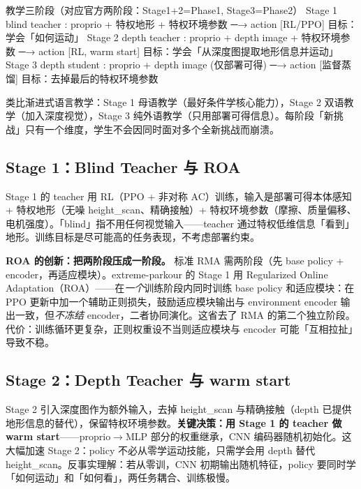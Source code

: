 \begin{codebox}[text]{教学三阶段（对应官方两阶段：Stage1+2=Phase1, Stage3=Phase2）}
Stage 1  blind teacher : proprio + 特权地形 + 特权环境参数 ─→ action   [RL/PPO]
                         目标：学会「如何运动」
Stage 2  depth teacher : proprio + depth image + 特权环境参数 ─→ action [RL, warm start]
                         目标：学会「从深度图提取地形信息并运动」
Stage 3  depth student : proprio + depth image (仅部署可得) ─→ action   [监督蒸馏]
                         目标：去掉最后的特权环境参数
\end{codebox}

类比渐进式语言教学：Stage 1 母语教学（最好条件学核心能力），Stage 2 双语教学（加入深度视觉），Stage 3 纯外语教学（只用部署可得信息）。每阶段「新挑战」只有一个维度，学生不会因同时面对多个全新挑战而崩溃。

\subsection{Stage 1：Blind Teacher 与 ROA}
\label{sec:rlmc-priv-stage1}

Stage 1 的 teacher 用 RL（PPO + 非对称 AC）训练，输入是部署可得本体感知 + 特权地形（无噪 height\_scan、精确接触）+ 特权环境参数（摩擦、质量偏移、电机强度）。「blind」指不用任何视觉输入——teacher 通过特权低维信息「看到」地形。训练目标是尽可能高的任务表现，不考虑部署约束。

\textbf{ROA 的创新：把两阶段压成一阶段。} 标准 RMA 需两阶段（先 base policy + encoder，再适应模块）。extreme-parkour 的 Stage 1 用 Regularized Online Adaptation（ROA）——在\emph{一个}训练阶段内同时训练 base policy 和适应模块：在 PPO 更新中加一个辅助正则损失，鼓励适应模块输出与 environment encoder 输出一致，但\emph{不冻结} encoder，二者协同演化。这省去了 RMA 的第二个独立阶段。代价：训练循环更复杂，正则权重设不当则适应模块与 encoder 可能「互相拉扯」导致不稳。

\subsection{Stage 2：Depth Teacher 与 warm start}
\label{sec:rlmc-priv-stage2}

Stage 2 引入深度图作为额外输入，去掉 height\_scan 与精确接触（depth 已提供地形信息的替代），保留特权环境参数。\textbf{关键决策：用 Stage 1 的 teacher 做 warm start}——proprio$\to$MLP 部分的权重继承，CNN 编码器随机初始化。这大幅加速 Stage 2：policy 不必从零学运动技能，只需学会用 depth 替代 height\_scan。反事实理解：若从零训，CNN 初期输出随机特征，policy 要同时学「如何运动」和「如何看」，两任务耦合、训练极慢。


